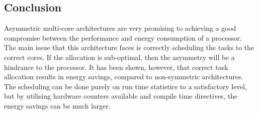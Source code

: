 \subsection{Conclusion}


Asymmetric multi-core architectures are very promising to achieving a good compromise between the performance and energy consumption of a processor. 
The main issue that this architecture faces is correctly scheduling the tasks to the correct cores. 
If the allocation is sub-optimal, then the asymmetry will be a hindrance to the processor. 
It has been shown, however, that correct task allocation results in energy savings, compared to non-symmetric architectures. 
The scheduling can be done purely on run time statistics to a satisfactory level, but by utilising hardware counters available and compile time directives, the energy savings can be much larger.

